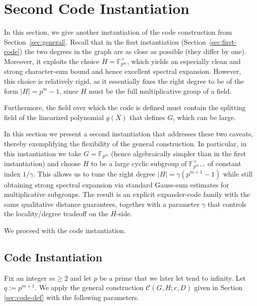 \documentclass[11pt]{article}
\theoremstyle{plain}
\theoremstyle{definition}
\begin{document}
\section{Second Code Instantiation}
\label{sec:second-instantiation}
In this section, we give another instantiation of the code construction from Section~\ref{sec:general}. 
Recall that in the first instantiation (Section~\ref{sec:first-code}) the two degrees in the graph are as close as possible (they differ by one). Moreover, it exploits the choice $H=\mathbb{F}_{p^m}^\times$, which yields an especially clean and strong character-sum bound and hence excellent spectral expansion. 
However, this choice is relatively rigid, as it essentially fixes the right degree to be of the form $|H|=p^m-1$, since $H$ must be the full multiplicative group of a field.


Furthermore, the field over which the code is defined must contain the splitting field of the linearized polynomial $g(X)$ that defines $G$, which can be large.

In this section we present a second instantiation that addresses these two caveats, thereby exemplifying the flexibility of the general construction. 
In particular, in this instantiation we take $G=\mathbb{F}_{p^m}$ (hence algebraically simpler than in the first instantiation) and choose $H$ to be a large cyclic subgroup of $\mathbb{F}_{p^{m+1}}^\times$ of constant index $1/\gamma$.
This allows us to tune the right degree $|H|=\gamma(p^{m+1}-1)$ while still obtaining strong spectral expansion via standard Gauss-sum estimates for multiplicative subgroups.
The result is an explicit expander-code family with the same qualitative distance guarantees, together with a parameter $\gamma$ that controls the locality/degree tradeoff on the $H$-side.

We proceed with the code instantiation.
\subsection{Code Instantiation}
\label{sec:second-code-instan}
Fix an integer $m\ge 2$ and let $p$ be a prime that we later let tend to infinity.
Let $q:=p^{m+1}$.
We apply the general construction $\mathcal{C}(G, H; r, D)$ given in Section \ref{sec:code-def} with the following parameters.
\end{document}
